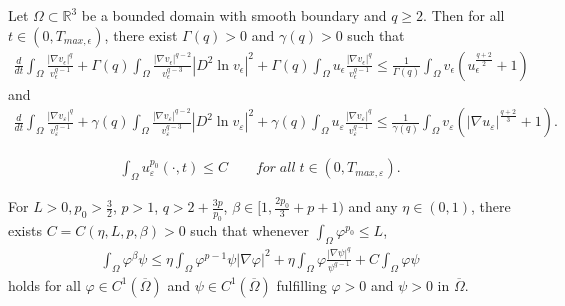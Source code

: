 \documentclass[10pt,a4paper]{amsart}
\begin{document}
\begin{lemma}\label{lemma2.7}
Let $\Omega \subset \mathbb R^3$ be a bounded domain with smooth boundary and $q\geq 2$. Then for all $t\in (0,T_{max,\epsilon})$, there exist
$\Gamma(q)>0$ and $\gamma(q)>0$ such that
\begin{align}\label{2.29}
    \frac{d}{dt}\int_{\Omega}\frac{|\nabla v_{\epsilon}|^q}{v_{\epsilon}^{q-1}}+\Gamma(q)\int_{\Omega}\frac{|\nabla
    v_{\epsilon}|^{q-2}}{v_{\epsilon}^{q-3}}|D^2\ln{v_{\epsilon}}|^2+\Gamma(q)\int_{\Omega}u_{\epsilon}\frac{|\nabla
    v_{\epsilon}|^q}{v_{\epsilon}^{q-1}}\leq \frac{1}{\Gamma(q)}\int_{\Omega}v_{\epsilon}(u_{\epsilon}^{\frac{q+2}{2}}+1)
\end{align}
and
\begin{align}\label{2.30}
    \frac{d}{dt}\int_{\Omega}\frac{|\nabla v_{\varepsilon}|^q}{v_{\varepsilon}^{q-1}}+\gamma(q)\int_{\Omega}\frac{|\nabla
    v_{\varepsilon}|^{q-2}}{v_{\varepsilon}^{q-3}}|D^2\ln{v_{\varepsilon}}|^2+\gamma(q)\int_{\Omega}u_{\varepsilon}\frac{|\nabla
    v_{\varepsilon}|^q}{v_{\varepsilon}^{q-1}}\leq \frac{1}{\gamma(q)}\int_{\Omega}v_{\varepsilon}(|\nabla u_{\varepsilon}|^{\frac{q+2}{3}}+1).
\end{align}
\end{lemma}

\begin{align}\label{3.15}
    \int_{\Omega}u_{\varepsilon}^{p_0}(\cdot,t)\leq C\qquad for\;all\; t\in (0,T_{max,\varepsilon}).
\end{align}

\begin{lemma}\label{lemma3.7}
For $L>0,p_0>\frac{3}{2}$, $p>1$, $q>2+\frac{3p}{p_0}$, $\beta\in [1,\frac{2p_0}{3}+p+1)$
and any $\eta\in(0,1)$, there exists $C=C(\eta, L,p,\beta
 )>0$ such that
whenever  $\int_{\Omega}\varphi^{p_0}\leq L$,
  \begin{align}\label{3.25}
    \int_{\Omega}\varphi^{\beta} \psi\leq \eta \int_{\Omega}\varphi^{p-1}\psi|\nabla
    \varphi|^2+\eta \int_{\Omega}\varphi\frac{|\nabla  \psi|^q}{{\psi}^{q-1}}+C\int_{\Omega}\varphi \psi
\end{align} holds for   all $\varphi\in C^1(\overline \Omega)$ and $\psi \in C^1(\overline \Omega)$ fulfilling $\varphi> 0$ and $\psi>0$ in $\overline \Omega$.
\end{lemma}
\end{document}

